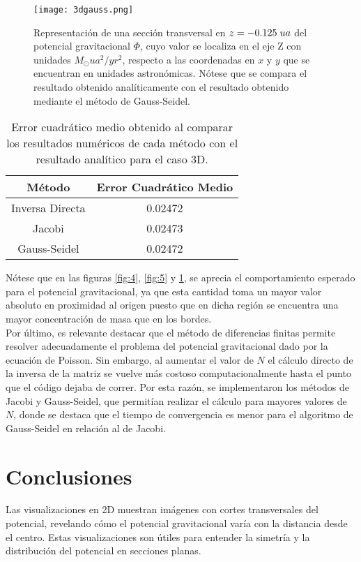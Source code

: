 \documentclass[reprint,amsmath,amssymb,aps]{revtex4-2}
\begin{document}
\begin{figure}
    \centering
    \texttt{[image: 3dgauss.png]}
    \caption{Representación de una sección transversal en $z=-0.125 \hspace{0.1 cm} ua$ del potencial gravitacional $\varPhi$, cuyo valor se localiza en el eje Z con unidades $M_{\odot} ua^2/yr^2$, respecto a las coordenadas en $x$ y $y$ que se encuentran en unidades astronómicas. Nótese que se compara el resultado obtenido analíticamente con el resultado obtenido mediante el método de Gauss-Seidel.}
    \label{fig:6}
\end{figure}
\begin{table}
    \centering
    \begin{tabular}{|c|c|} \hline
    \rowcolor[HTML]{EFEFEF}
         Método & Error Cuadrático Medio \\ \hline
         Inversa Directa &   0.02472 \\ \hline
         Jacobi & 0.02473\\ \hline
         Gauss-Seidel & 0.02472\\ \hline
    \end{tabular}
    \caption{Error cuadrático medio obtenido al comparar los resultados numéricos de cada método con el resultado analítico para el caso 3D.}
    \label{tab:2}
\end{table}

Nótese que en las figuras \ref{fig:4}, \ref{fig:5} y \ref{fig:6}, se aprecia el comportamiento esperado para el potencial gravitacional, ya que esta cantidad toma un mayor valor absoluto en proximidad al origen puesto que en dicha región se encuentra una mayor concentración de masa que en los bordes.\\

Por último, es relevante destacar que el método de diferencias finitas permite resolver adecuadamente el problema del potencial gravitacional dado por la ecuación de Poisson. Sin embargo, al aumentar el valor de $N$ el cálculo directo de la inversa de la matriz se vuelve más costoso computacionalmente hasta el punto que el código dejaba de correr. Por esta razón, se implementaron los métodos de Jacobi y Gauss-Seidel, que permitían realizar el cálculo para mayores valores de $N$, donde se destaca que el tiempo de convergencia es menor para el algoritmo de Gauss-Seidel en relación al de Jacobi.\\

 
\section{Conclusiones}
Las visualizaciones en 2D muestran imágenes con cortes transversales del potencial, revelando cómo el potencial gravitacional varía con la distancia desde el centro. Estas visualizaciones son útiles para entender la simetría y la distribución del potencial en secciones planas.
\end{document}
